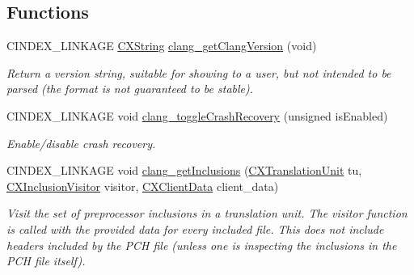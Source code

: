 \subsection*{Functions}
\begin{DoxyCompactItemize}
\item 
\mbox{\label{group__CINDEX__MISC_ga307e960e9dccaf721c0032cd4edd8908}} 
C\+I\+N\+D\+E\+X\+\_\+\+L\+I\+N\+K\+A\+GE \hyperlink{structCXString}{C\+X\+String} \hyperlink{group__CINDEX__MISC_ga307e960e9dccaf721c0032cd4edd8908}{clang\+\_\+get\+Clang\+Version} (void)
\begin{DoxyCompactList}\small\item\em Return a version string, suitable for showing to a user, but not intended to be parsed (the format is not guaranteed to be stable). \end{DoxyCompactList}\item 
C\+I\+N\+D\+E\+X\+\_\+\+L\+I\+N\+K\+A\+GE void \hyperlink{group__CINDEX__MISC_ga45afc52d275aa0587c69d4b6d2f10bf2}{clang\+\_\+toggle\+Crash\+Recovery} (unsigned is\+Enabled)
\begin{DoxyCompactList}\small\item\em Enable/disable crash recovery. \end{DoxyCompactList}\item 
\mbox{\label{group__CINDEX__MISC_ga4363bd8c203ca2b5dfc23c5765695d60}} 
C\+I\+N\+D\+E\+X\+\_\+\+L\+I\+N\+K\+A\+GE void \hyperlink{group__CINDEX__MISC_ga4363bd8c203ca2b5dfc23c5765695d60}{clang\+\_\+get\+Inclusions} (\hyperlink{group__CINDEX_gacdb7815736ca709ce9a5e1ec2b7e16ac}{C\+X\+Translation\+Unit} tu, \hyperlink{group__CINDEX__MISC_ga075c50e5cf912f15d902cff864ea7d13}{C\+X\+Inclusion\+Visitor} visitor, \hyperlink{group__CINDEX_gacfa40c3de26d228c0d898403c2c21612}{C\+X\+Client\+Data} client\+\_\+data)
\begin{DoxyCompactList}\small\item\em Visit the set of preprocessor inclusions in a translation unit. The visitor function is called with the provided data for every included file. This does not include headers included by the P\+CH file (unless one is inspecting the inclusions in the P\+CH file itself). \end{DoxyCompactList}\item 
\mbox{\label{group__CINDEX__MISC_ga6be809ca82538f4a610d9a5b18a10ccb}} 

\end{DoxyCompactItemize}
